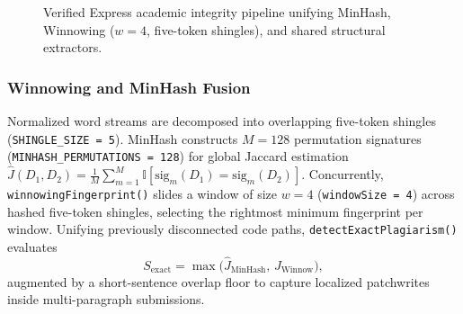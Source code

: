 \documentclass[conference]{IEEEtran}
\begin{document}
\begin{figure}[t]
\centering
{}
\caption{Verified Express academic integrity pipeline unifying MinHash, Winnowing ($w{=}4$, five-token shingles), and shared structural extractors.}
\label{fig:integrity_pipe}
\end{figure}

\subsubsection{Winnowing and MinHash Fusion}
Normalized word streams are decomposed into overlapping five-token shingles (\texttt{SHINGLE\_SIZE = 5}). MinHash constructs $M{=}128$ permutation signatures (\texttt{MINHASH\_PERMUTATIONS = 128}) for global Jaccard estimation $\hat{J}(D_1, D_2) = \frac{1}{M}\sum_{m=1}^{M}\mathbb{I}[\text{sig}_m(D_1){=}\text{sig}_m(D_2)]$. Concurrently, \texttt{winnowingFingerprint()} slides a window of size $w{=}4$ (\texttt{windowSize = 4}) across hashed five-token shingles, selecting the rightmost minimum fingerprint per window. Unifying previously disconnected code paths, \texttt{detectExactPlagiarism()} evaluates
\begin{equation}
S_{\text{exact}} = \max\!\big(\hat{J}_{\text{MinHash}},\, J_{\text{Winnow}}\big),
\end{equation}
augmented by a short-sentence overlap floor to capture localized patchwrites inside multi-paragraph submissions.
\end{document}

